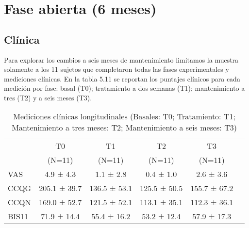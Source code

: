 \section{Fase abierta (6 meses)}
\subsection{Clínica}
Para explorar los cambios a seis meses de mantenimiento limitamos la muestra solamente a los 11 sujetos que completaron todas las fases experimentales y mediciones clínicas. En la tabla 5.11 se reportan los puntajes clínicos para cada medición por fase: basal (T0); tratamiento a dos semanas (T1); mantenimiento a tres (T2) y a seis meses (T3).

\begin{table}[!hbp]
    \centering
    \small
    \caption{Mediciones clínicas longitudinales (Basales: T0; Tratamiento: T1; Mantenimiento a tres meses: T2; Mantenimiento a seis meses: T3)}
    \label{tab:cl3}
\begin{tabular}{lccccc}
\hline
 & T0 & T1 & T2 & T3 \\
 & (N=11) & (N=11) & (N=11) & (N=11) \\
\hline
VAS   &  4.9 ±  4.3 &  1.1 ±  2.8 &  0.4 ±  1.0 &  2.6 ±  3.6 \\
CCQG  & 205.1 ± 39.7 & 136.5 ± 53.1 & 125.5 ± 50.5 & 155.7 ± 67.2 \\
CCQN  & 169.0 ± 52.7 & 121.5 ± 52.1 & 113.1 ± 35.1 & 112.3 ± 36.1 \\
BIS11 & 71.9 ± 14.4 & 55.4 ± 16.2 & 53.2 ± 12.4 & 57.9 ± 17.3 \\
\hline
\end{tabular}
\end{table}

